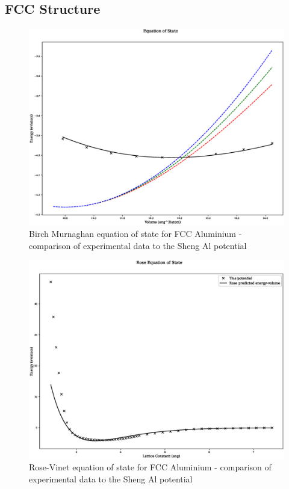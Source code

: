 \subsection{FCC Structure}
 
\begin{figure}
  \begin{center}
    \includegraphics[width=0.6\linewidth]{appendix/transferability/transferability/Fe_mhsasa/equation_of_state_bp_fcc.eps}
  \end{center}
	\caption{Birch Murnaghan equation of state for FCC Aluminium - comparison of experimental data to the Sheng Al potential}
	\label{fig:shengalfccbm}
\end{figure}

\begin{figure}
  \begin{center}
    \includegraphics[width=0.6\linewidth]{appendix/transferability/transferability/Fe_mhsasa/rose_plot_bp_fcc.eps}
  \end{center}
	\caption{Rose-Vinet equation of state for FCC Aluminium - comparison of experimental data to the Sheng Al potential}
	\label{fig:shengalfccbm}
\end{figure}








